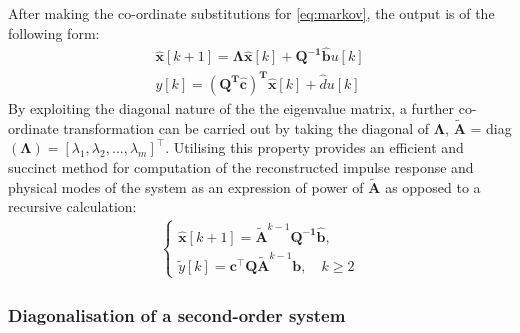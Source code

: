 After making the co-ordinate substitutions for \ref{eq:markov}, the output is of the following form:
\begin{align}
\label{eq:markov-eig}
    \mathbf{\hat{x}}[k + 1] = \mathbf{\Lambda} \mathbf{ \hat{x}}[k] + \mathbf{Q^{-1} \hat{b}}u[k]\\
    y[k] = \left( \mathbf{Q^{T} \hat{c}} \right)^\mathbf{T} \mathbf{ \hat{x}}[k] + \hat{d}u[k]
\end{align}
By exploiting the diagonal nature of the the eigenvalue matrix, a further co-ordinate transformation can be carried out by taking the diagonal of $\mathbf{\Lambda}$, $\mathbf{\tilde{A}}$ = diag$(\mathbf{\Lambda}) = [\lambda_1, \lambda_2, \dots, \lambda_m]^{\top}$. Utilising this property provides an efficient and succinct method for computation of the reconstructed impulse response and physical modes of the system as an expression of power of $\mathbf{\tilde{A}}$ as opposed to a recursive calculation:
\begin{align}
\label{eq:markov-again}
\begin{cases}
    \mathbf{\hat{x}}[k + 1] =  \mathbf{\tilde{A}}^{k-1} \mathbf{Q^{-1} \hat{b}}, \\
    \tilde{y}[k] =  \mathbf{c}^{\top} \mathbf{Q} \mathbf{\tilde{A}}^{k-1}\mathbf{b}, \quad k \geq 2
\end{cases}
\end{align}

\subsubsection{Diagonalisation of a second-order system}
\label{sec:second-order}

